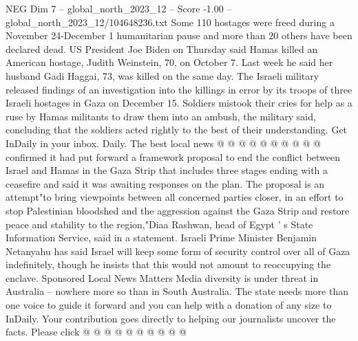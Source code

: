 \begin{textsample}{NEG Dim 7 – global\_north\_2023\_12 – Score -1.00 – global\_north\_2023\_12/104648236.txt}
Some 110 hostages were freed during a November 24-December 1 humanitarian pause and more than 20 others have been declared dead.
US President Joe Biden on Thursday said Hamas killed an American hostage, Judith Weinstein, 70, on October 7.
Last week he said her husband Gadi Haggai, 73, was killed on the same day.
The Israeli military released findings of an investigation into the killings in error by its troops of three Israeli hostages in Gaza on December 15.
Soldiers mistook their cries for help as a ruse by Hamas militants to draw them into an ambush, the military said, concluding that the soldiers acted rightly to the best of their understanding.
Get InDaily in your inbox.
Daily.
The best local news @ @ @ @ @ @ @ @ @ @ confirmed it had put forward a framework proposal to end the conflict between Israel and Hamas in the Gaza Strip that includes three stages ending with a ceasefire and said it was awaiting responses on the plan.
The proposal is an attempt"to bring viewpoints between all concerned parties closer, in an effort to stop Palestinian bloodshed and the aggression against the Gaza Strip and restore peace and stability to the region,"Diaa Rashwan, head of Egypt ' s State Information Service, said in a statement.
Israeli Prime Minister Benjamin Netanyahu has said Israel will keep some form of security control over all of Gaza indefinitely, though he insists that this would not amount to reoccupying the enclave.
Sponsored Local News Matters Media diversity is under threat in Australia -- nowhere more so than in South Australia.
The state needs more than one voice to guide it forward and you can help with a donation of any size to InDaily.
Your contribution goes directly to helping our journalists uncover the facts.
Please click @ @ @ @ @ @ @ @ @ @

\end{textsample}
